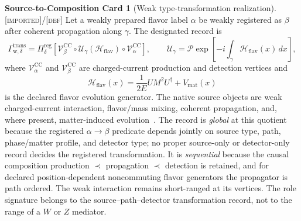 \documentclass[11pt]{article}
\newcommand{\Defn}{\textsc{[def]}}
\newcommand{\Imp}{\textsc{[imported]}}
\theoremstyle{definition}
\newtheorem{compositioncard}{Source-to-Composition Card}
\begin{document}
\begin{compositioncard}[Weak type-transformation realization]
\label{card:weak-transformation-realization}
\Imp{}/\Defn{} Let a weakly prepared flavor label $\alpha$ be weakly registered as
$\beta$ after coherent propagation along $\gamma$. The designated record is
\begin{equation}
\Gamma_{\mathrm w,\delta}^{\mathrm{trans}}=
\Pi_{\delta}^{\mathrm{reg}}\!\left[
\mathcal V_{\beta}^{\mathrm{CC}}\circ
\mathcal U_{\gamma}(\mathcal H_{\mathrm{flav}})\circ
\mathcal V_{\alpha}^{\mathrm{CC}}
\right],
\qquad
\mathcal U_{\gamma}=
\mathcal P\exp\!\left[-i\int_{\gamma}\mathcal H_{\mathrm{flav}}(x)\,dx\right],
\label{eq:weak-transformation-record}
\end{equation}
where $\mathcal V_{\alpha}^{\mathrm{CC}}$ and
$\mathcal V_{\beta}^{\mathrm{CC}}$ are charged-current production and detection
vertices and
\begin{equation}
\mathcal H_{\mathrm{flav}}(x)=
\frac{1}{2E}U M^2U^{\dagger}+V_{\mathrm{mat}}(x)
\label{eq:weak-flavor-hamiltonian}
\end{equation}
is the declared flavor evolution generator. The native source objects are weak
charged-current interaction, flavor/mass mixing, coherent propagation, and, where
present, matter-induced evolution~\cite{S_PDG2024,S_MakiNakagawaSakata1962,
S_Wolfenstein1978}. The record is \emph{global} at this quotient because the
registered $\alpha\!\to\!\beta$ predicate depends jointly on source type, path,
phase/matter profile, and detector type; no proper source-only or detector-only
record decides the registered transformation. It is \emph{sequential} because the
causal composition production $\prec$ propagation $\prec$ detection is retained,
and for declared position-dependent noncommuting flavor generators the propagator
is path ordered. The weak interaction remains short-ranged at its vertices. The
role signature belongs to the source--path--detector transformation record, not to
the range of a $W$ or $Z$ mediator.
\end{compositioncard}
\end{document}
